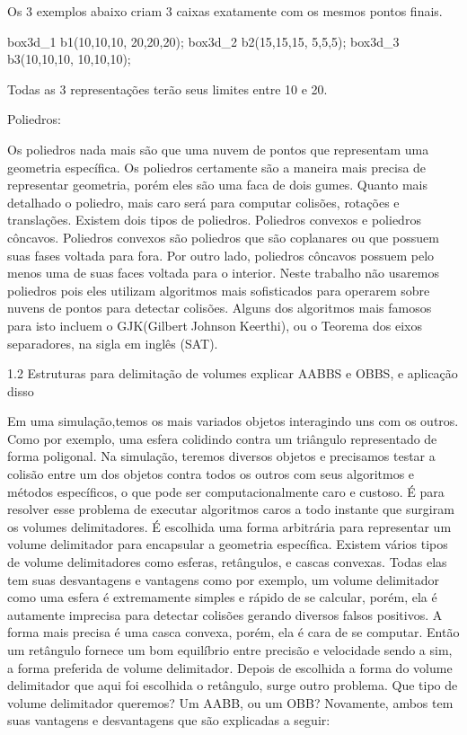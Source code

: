 Os 3 exemplos abaixo criam 3 caixas exatamente com os mesmos pontos finais.

box3d_1 b1({10,10,10}, {20,20,20});
box3d_2 b2({15,15,15}, {5,5,5});
box3d_3 b3({10,10,10}, {10,10,10});

Todas as 3 representações terão seus limites entre 10 e 20.


Poliedros:

Os poliedros nada mais são que uma nuvem de pontos que representam uma
geometria específica. Os poliedros certamente são a maneira mais precisa de
representar geometria, porém eles são uma faca de dois gumes. Quanto mais
detalhado o poliedro, mais caro será para computar colisões, rotações e
translações. Existem dois tipos de poliedros. Poliedros convexos e poliedros
côncavos. Poliedros convexos são poliedros que são coplanares ou que possuem
suas fases voltada para fora. Por outro lado, poliedros côncavos possuem
pelo menos uma de suas faces voltada para o interior.
Neste trabalho não usaremos poliedros pois eles utilizam algoritmos mais
sofisticados para operarem sobre nuvens de pontos para detectar colisões.
Alguns dos algoritmos mais famosos para isto incluem o
GJK(GilbertJohnsonKeerthi), ou o Teorema dos eixos separadores, na sigla em
inglês (SAT).

1.2 Estruturas para delimitação de volumes
explicar AABBS e OBBS, e aplicação disso

Em uma simulação,temos os mais variados objetos interagindo uns com os outros.
Como por exemplo, uma esfera colidindo contra um triângulo representado de
forma poligonal. Na simulação, teremos diversos objetos e precisamos testar a
colisão entre um dos objetos contra todos os outros com seus algoritmos e
métodos específicos, o que pode ser computacionalmente caro e custoso. É para
resolver esse problema de executar algoritmos caros a todo instante que
surgiram os volumes delimitadores. É escolhida uma forma arbitrária para
representar um volume delimitador para encapsular a geometria específica.
Existem vários tipos de volume delimitadores como esferas, retângulos, e cascas
convexas. Todas elas tem suas desvantagens e vantagens como por exemplo, um
volume delimitador como uma esfera é extremamente simples e rápido de se
calcular, porém, ela é autamente imprecisa para detectar colisões gerando
diversos falsos positivos.
A forma mais precisa é uma casca convexa, porém, ela é cara de se computar.
Então um retângulo fornece um bom equilíbrio entre precisão e velocidade sendo
a sim, a forma preferida de volume delimitador.
Depois de escolhida a forma do volume delimitador que aqui foi escolhida o
retângulo, surge outro problema. Que tipo de volume delimitador queremos? Um
AABB, ou um OBB? Novamente, ambos tem suas vantagens e desvantagens que são
explicadas a seguir:

